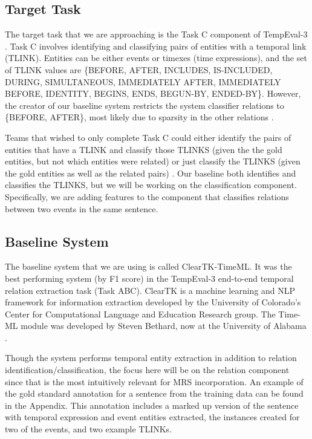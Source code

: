 \documentclass[11pt]{article}
\begin{document}
\subsection{Target Task}

The target task that we are approaching is the Task C component of TempEval-3 \cite{UzZaman:13}. Task C involves identifying and classifying pairs of entities with a temporal link (TLINK). Entities can be either events or timexes (time expressions), and the set of TLINK values are \{BEFORE, AFTER, INCLUDES, IS-INCLUDED, DURING, SIMULTANEOUS, IMMEDIATELY AFTER, IMMEDIATELY BEFORE, IDENTITY, BEGINS, ENDS, BEGUN-BY, ENDED-BY\}. However, the creator of our baseline system restricts the system classifier relations to \{BEFORE, AFTER\}, most likely due to sparsity in the other relations \cite{Bethard:13}.

Teams that wished to only complete Task C could either identify the pairs of entities that have a TLINK and classify those TLINKS (given the the gold entities, but not which entities were related) or just classify the TLINKS (given the gold entities as well as the related pairs) \cite{UzZaman:13}. Our baseline both identifies and classifies the TLINKS, but we will be working on the classification component. Specifically, we are adding features to the component that classifies relations between two events in the same sentence.

\subsection{Baseline System}

The baseline system that we are using is called ClearTK-TimeML. It was the best performing system (by F1 score) in the TempEval-3 end-to-end temporal relation extraction task (Task ABC). ClearTK is a machine learning and NLP framework for information extraction developed by the University of Colorado's Center for Computational Language and Education Research group. The Time-ML module was developed by Steven Bethard, now at the University of Alabama \cite{Bethard:14}.

Though the system performs temporal entity extraction in addition to relation identification/classification, the focus here will be on the relation component since that is the most intuitively relevant for MRS incorporation. An example of the gold standard annotation for a sentence from the training data can be found in the Appendix. This annotation includes a marked up version of the sentence with temporal expression and event entities extracted, the instances created for two of the events, and two example TLINKs.
\end{document}

